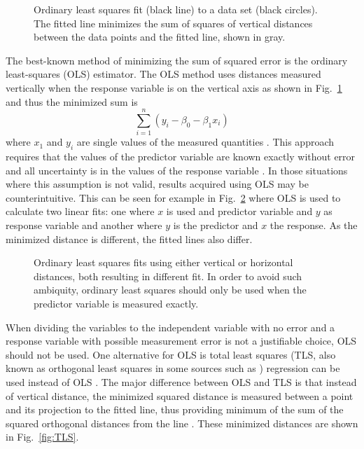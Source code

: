 \documentclass[english, oneside]{HYgradu}
\begin{document}
\begin{figure}
    \centering
    
    \caption{Ordinary least squares fit (black line) to a data set (black circles). The fitted line minimizes the sum of squares of vertical distances between the data points and the fitted line, shown in gray.}\label{fig:OLS}
\end{figure}

The best-known method of minimizing the sum of squared error is the ordinary least-squares (OLS) estimator. The OLS method uses distances measured vertically when the response variable is on the vertical axis as shown in Fig.\ \ref{fig:OLS} and thus the minimized sum is
\begin{equation}
	\sum_{i=1}^n (y_i - \beta_0 - \beta_1 x_i)
\end{equation}
where $x_1$ and $y_i$ are single values of the measured quantities \citep{feigelson2012modern}. This approach requires that the values of the predictor variable are known exactly without error and all uncertainty is in the values of the response variable \citep{feigelson2012modern}. In those situations where this assumption is not valid, results acquired using OLS may be counterintuitive. This can be seen for example in Fig.\ \ref{fig:OLSproblem} where OLS is used to calculate two linear fits: one where $x$ is used and predictor variable and $y$ as response variable and another where $y$ is the predictor and $x$ the response. As the minimized distance is different, the fitted lines also differ.

\begin{figure}
    \centering
    
    \caption{Ordinary least squares fits using either vertical or horizontal distances, both resulting in different fit. In order to avoid such ambiquity, ordinary least squares should only be used when the predictor variable is measured exactly.}\label{fig:OLSproblem}
\end{figure}

When dividing the variables to the independent variable with no error and a response variable with possible measurement error is not a justifiable choice, OLS should not be used. One alternative for OLS is total least squares (TLS, also known as orthogonal least squares in some sources such as \citep{feigelson2012modern}) regression can be used instead of OLS \citep{markovsky2007overview}.  The major difference between OLS and TLS is that instead of vertical distance, the minimized squared distance is measured between a point and its projection to the fitted line, thus providing minimum of the sum of the squared orthogonal distances from the line \citep{feigelson2012modern}. These minimized distances are shown in Fig.\ \ref{fig:TLS}.
\end{document}
